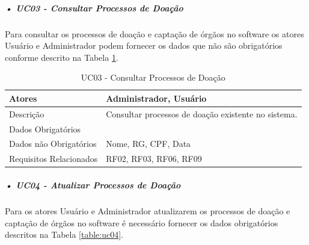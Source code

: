 \documentclass[portuguese,oneside]{tcc}
\begin{document}


\subparagraph{• UC03 - Consultar Processos de Doação}
Para consultar os processos de doação e captação de órgãos no software os atores Usuário e Administrador podem fornecer os dados que não são obrigatórios conforme descrito na Tabela \ref{table:uc03}.

\begin{table}
\centering
\caption{UC03 - Consultar Processos de Doação} \label{table:uc03}
\begin{tabular}{ |p{5cm}|p{5cm}|  }

\hline
Atores & 
Administrador, Usuário\\

\hline
Descrição & 
 
Consultar processos de doação existente no sistema.
 \\

\hline
Dados Obrigatórios & 
 \\

\hline
Dados não Obrigatórios & 
Nome, RG, CPF, Data
 \\

\hline
Requisitos Relacionados & 
RF02, RF03, RF06, RF09
 \\

\hline
\end{tabular}
\end{table}


\subparagraph{• UC04 - Atualizar Processos de Doação}
Para os atores Usuário e Administrador atualizarem os processos de doação e captação de órgãos no software é necessário fornecer os dados obrigatórios descritos na Tabela \ref{table:uc04}.
\end{document}
